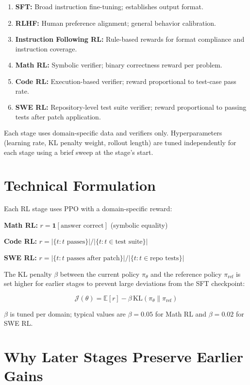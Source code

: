 \documentclass[10pt,twocolumn]{article}
\begin{document}
\begin{enumerate}[leftmargin=1.5em,itemsep=2pt]
  \item \textbf{SFT:} Broad instruction fine-tuning; establishes output format.
  \item \textbf{RLHF:} Human preference alignment; general behavior calibration.
  \item \textbf{Instruction Following RL:} Rule-based rewards for format compliance and instruction coverage.
  \item \textbf{Math RL:} Symbolic verifier; binary correctness reward per problem.
  \item \textbf{Code RL:} Execution-based verifier; reward proportional to test-case pass rate.
  \item \textbf{SWE RL:} Repository-level test suite verifier; reward proportional to passing tests after patch application.
\end{enumerate}

Each stage uses domain-specific data and verifiers only.
Hyperparameters (learning rate, KL penalty weight, rollout length) are tuned independently for each stage using a brief sweep at the stage's start.

\section{Technical Formulation}

Each RL stage uses PPO with a domain-specific reward:

\textbf{Math RL:} $r = \mathbf{1}[\text{answer correct}]$ (symbolic equality)

\textbf{Code RL:} $r = |\{t : t\text{ passes}\}| / |\{t : t\in\text{test suite}\}|$

\textbf{SWE RL:} $r = |\{t : t\text{ passes after patch}\}| / |\{t : t\in\text{repo tests}\}|$

The KL penalty $\beta$ between the current policy $\pi_\theta$ and the reference policy $\pi_\text{ref}$ is set higher for earlier stages to prevent large deviations from the SFT checkpoint:

\begin{equation}
\mathcal{J}(\theta) = \mathbb{E}[r] - \beta\, \mathrm{KL}(\pi_\theta \| \pi_\text{ref})
\end{equation}

$\beta$ is tuned per domain; typical values are $\beta = 0.05$ for Math RL and $\beta = 0.02$ for SWE RL.

\section{Why Later Stages Preserve Earlier Gains}
\end{document}
